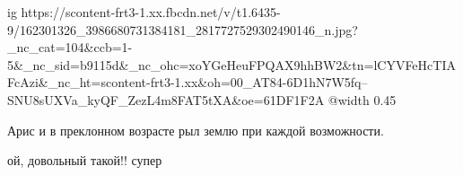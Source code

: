 
 
 
 
 

\ifcmt
  ig https://scontent-frt3-1.xx.fbcdn.net/v/t1.6435-9/162301326_3986680731384181_2817727529302490146_n.jpg?_nc_cat=104&ccb=1-5&_nc_sid=b9115d&_nc_ohc=xoYGeHeuFPQAX9hhBW2&tn=lCYVFeHcTIAFcAzi&_nc_ht=scontent-frt3-1.xx&oh=00_AT84-6D1hN7W5fq--SNU8sUXVa_kyQF_ZezL4m8FAT5tXA&oe=61DF1F2A
  @width 0.45
\fi

Арис и в преклонном возрасте рыл землю при каждой возможности.

ой, довольный такой!! супер
